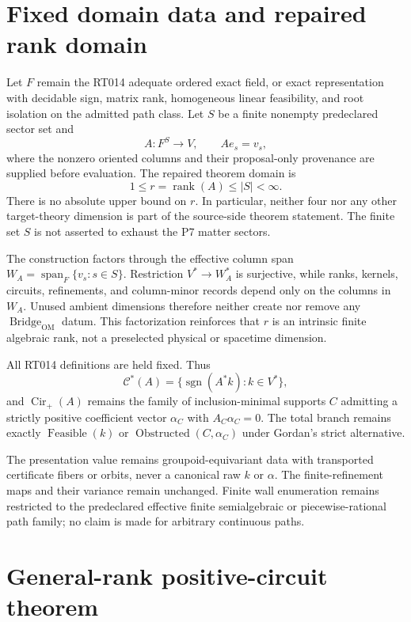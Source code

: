 \documentclass[11pt]{article}
\newcommand{\Cstar}{\mathcal{C}^{*}}
\newcommand{\Cirp}{\operatorname{Cir}_{+}}
\newcommand{\Bridge}{\operatorname{Bridge}_{\mathrm{OM}}}
\begin{document}
\section{Fixed domain data and repaired rank domain}

Let $F$ remain the RT014 adequate ordered exact field, or exact
representation with decidable sign, matrix rank, homogeneous linear
feasibility, and root isolation on the admitted path class.  Let $S$ be a
finite nonempty predeclared sector set and
\[
 A:F^S\longrightarrow V,\qquad A e_s=v_s,
\]
where the nonzero oriented columns and their proposal-only provenance are
supplied before evaluation.  The repaired theorem domain is
\[
 1\le r=\operatorname{rank}(A)\le |S|<\infty.
\]
There is no absolute upper bound on $r$.  In particular, neither four nor any
other target-theory dimension is part of the source-side theorem statement.
The finite set $S$ is not asserted to exhaust the P7 matter sectors.

The construction factors through the effective column span
$W_A=\operatorname{span}_F\{v_s:s\in S\}$.  Restriction
$V^*\to W_A^*$ is surjective, while ranks, kernels, circuits, refinements, and
column-minor records depend only on the columns in $W_A$.  Unused ambient
dimensions therefore neither create nor remove any $\Bridge$ datum.  This
factorization reinforces that $r$ is an intrinsic finite algebraic rank, not a
preselected physical or spacetime dimension.

All RT014 definitions are held fixed.  Thus
\[
 \Cstar(A)=\{\operatorname{sgn}(A^*k):k\in V^*\},
\]
and $\Cirp(A)$ remains the family of inclusion-minimal supports $C$ admitting
a strictly positive coefficient vector $\alpha_C$ with
$A_C\alpha_C=0$.  The total branch remains exactly
$\operatorname{Feasible}(k)$ or
$\operatorname{Obstructed}(C,\alpha_C)$ under Gordan's strict alternative.

The presentation value remains groupoid-equivariant data with transported
certificate fibers or orbits, never a canonical raw $k$ or $\alpha$.  The
finite-refinement maps and their variance remain unchanged.  Finite wall
enumeration remains restricted to the predeclared effective finite
semialgebraic or piecewise-rational path family; no claim is made for arbitrary
continuous paths.

\section{General-rank positive-circuit theorem}
\end{document}
